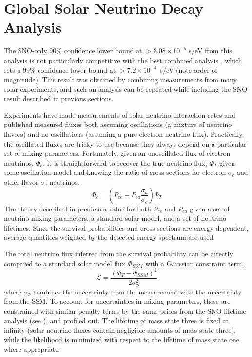 \clearpage

\section{Global Solar Neutrino Decay Analysis}

The SNO-only $90\%$ confidence lower bound at $>8.08\times10^{-5}$ s/eV from this analysis is not particularly competitive with the best combined analysis \cite{picoreti}, which sets a $99\%$ confidence lower bound at $>7.2\times10^{-4}$~s/eV (note order of magnitude).
This result was obtained by combining measurements from many solar experiments, and such an analysis can be repeated while including the SNO result described in previous sections.

Experiments have made measurements of solar neutrino interaction rates and published measured fluxes both assuming oscillations (a mixture of neutrino flavors) and no oscillations (assuming a pure electron neutrino flux). 
Practically, the oscillated fluxes are tricky to use because they always depend on a particular set of mixing parameters.
Fortunately, given an unoscillated flux of electron neutrinos, $\Phi_e$, it is straightforward to recover the true neutrino flux, $\Phi_T$ given some oscillation model and knowing the ratio of cross sections for electron $\sigma_e$ and other flavor $\sigma_a$ neutrinos.
\begin{equation}
\Phi_e = (P_{ee} + P_{ea} \frac{\sigma_a}{\sigma_e})\Phi_T
\label{flux_conv}
\end{equation}
The theory described in  predicts a value for both $P_{ee}$ and $P_{ea}$ given a set of neutrino mixing parameters, a standard solar model, and a set of neutrino lifetimes.
Since the survival probabilities and cross sections are energy dependent, average quantities weighted by the detected energy spectrum are used.

The total neutrino flux inferred from the survival probability can be directly compared to a standard solar model flux $\Phi_{SSM}$ with a Gaussian constraint term:
\begin{equation}
\mathcal{L} = \frac{(\Phi_T - \Phi_{SSM})^2}{2 \sigma_\Phi^2}
\label{combolike}
\end{equation}
where $\sigma_\Phi$ combines the uncertainty from the measurement with the uncertainty from the SSM.
To account for uncertainties in mixing parameters, these are constrained with similar penalty terms by the same priors from the SNO lifetime analysis (see ), and profiled out. 
The lifetime of mass state three is fixed at infinity (solar neutrino fluxes contain negligible amounts of mass state three), while the likelihood is minimized with respect to the lifetime of mass state one where appropriate.

